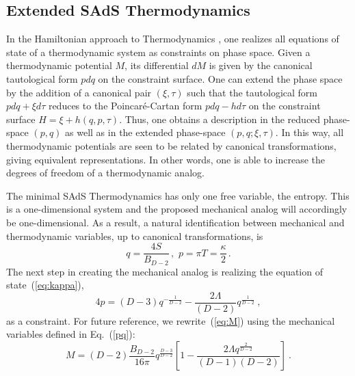 \documentclass[prd,onecolumn,notitlepage,amsmath,nofootinbib,superscriptaddress,showpacs,showkeys]{revtex4-1}
\begin{document}
\subsection{Extended SAdS Thermodynamics}

In the Hamiltonian approach to Thermodynamics \cite{baldfresmol2016},
one realizes all equations of state of a thermodynamic system as constraints
on phase space. Given a thermodynamic potential $M$, its differential
$dM$ is given by the canonical tautological form $pdq$ on the constraint
surface. One can extend the phase space by the addition of a canonical
pair $\left(\xi,\tau\right)$ such that the tautological form $pdq+\xi d\tau$
reduces to the Poincar\'e-Cartan form $pdq-hd\tau$ on the constraint
surface $H=\xi+h\left(q,p,\tau\right)$. Thus, one obtains a description
in the reduced phase-space $\left(p,q\right)$ as well as in the extended
phase-space $\left(p,q;\xi,\tau\right)$. In this way, all thermodynamic
potentials are seen to be related by canonical transformations, giving
equivalent representations. In other words, one is able to increase
the degrees of freedom of a thermodynamic analog.

The minimal SAdS Thermodynamics has only one free variable, the entropy. This is a one-dimensional system and the proposed
mechanical analog will accordingly be one-dimensional. As a result,
a natural identification between mechanical and thermodynamic variables,
up to canonical transformations, is 
\begin{equation}
q=\frac{4S}{B_{D-2}}\,,\,\, p=\pi T=\frac{\kappa}{2}\,.\label{pq}
\end{equation}
The next step in creating the mechanical analog is realizing the equation
of state~(\ref{eq:kappa}), 
\begin{equation}
4p=\left(D-3\right)q^{-\frac{1}{D-2}}-\frac{2\Lambda}{\left(D-2\right)}q^{\frac{1}{D-2}}~,\label{eq:momento}
\end{equation}
as a constraint. For future reference, we rewrite~(\ref{eq:M}) using
the mechanical variables defined in Eq.~(\ref{pq}): 
\begin{equation}
M=\left(D-2\right)\frac{B_{D-2}}{16\pi}q^{\frac{D-3}{D-2}}\left[1-\frac{2\Lambda q^{\frac{2}{D-2}}}{\left(D-1\right)\left(D-2\right)}\right]~.\label{eq:Mpq}
\end{equation}
\end{document}

